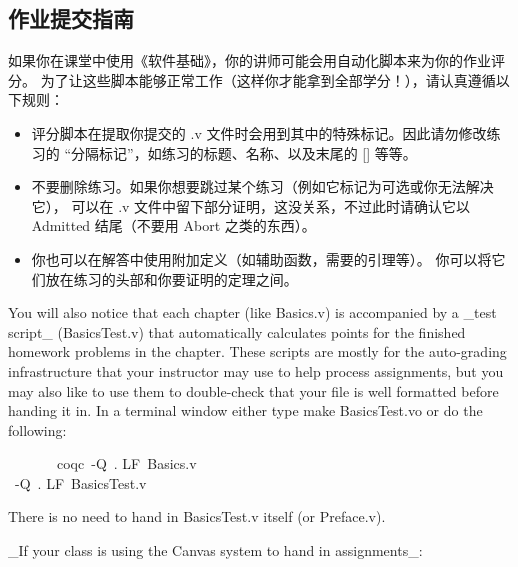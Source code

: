 \documentclass[utf8]{ctexart}
\providecommand{\tightlist}{%
  \setlength{\itemsep}{0pt}\setlength{\parskip}{0pt}}
\begin{document}
\protect\hypertarget{lab22}{}{}

\hypertarget{ux4f5cux4e1aux63d0ux4ea4ux6307ux5357}{%
\subsection{作业提交指南}\label{ux4f5cux4e1aux63d0ux4ea4ux6307ux5357}}

如果你在课堂中使用《软件基础》，你的讲师可能会用自动化脚本来为你的作业评分。
为了让这些脚本能够正常工作（这样你才能拿到全部学分！），请认真遵循以下规则：

\begin{itemize}
\tightlist
\item
  评分脚本在提取你提交的 {.{v}}
  文件时会用到其中的特殊标记。因此请勿修改练习的
  ``分隔标记''，如练习的标题、名称、以及末尾的 {{[}{]}} 等等。
\item
  不要删除练习。如果你想要跳过某个练习（例如它标记为可选或你无法解决它），
  可以在 {.{v}} 文件中留下部分证明，这没关系，不过此时请确认它以
  {{Admitted}} 结尾（不要用 {{Abort}} 之类的东西）。
\item
  你也可以在解答中使用附加定义（如辅助函数，需要的引理等）。
  你可以将它们放在练习的头部和你要证明的定理之间。
\end{itemize}

You will also notice that each chapter (like {{Basics.v}}) is
accompanied by a \_test script\_ ({{BasicsTest.v}}) that automatically
calculates points for the finished homework problems in the chapter.
These scripts are mostly for the auto-grading infrastructure that your
instructor may use to help process assignments, but you may also like to
use them to double-check that your file is well formatted before handing
it in. In a terminal window either type {{make}} {{BasicsTest.vo}} or do
the following:

~~~~~~~{coqc}~-{Q}~. {LF}~{Basics.v}\\
\hspace*{0.333em}\hspace*{0.333em}\hspace*{0.333em}\hspace*{0.333em}\hspace*{0.333em}\hspace*{0.333em}\hspace*{0.333em}{coqc}~-{Q}~.
{LF}~{BasicsTest.v}

There is no need to hand in {{BasicsTest.v}} itself (or {{Preface.v}}).

\_If your class is using the Canvas system to hand in assignments\_:
\end{document}

